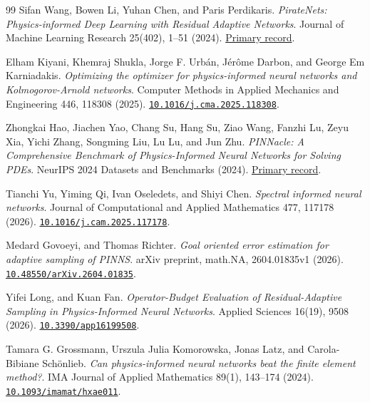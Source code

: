 \begin{thebibliography}{99}
Sifan Wang, Bowen Li, Yuhan Chen, and Paris Perdikaris.
\emph{PirateNets: Physics-informed Deep Learning with Residual Adaptive Networks}.
Journal of Machine Learning Research 25(402), 1--51 (2024).
\href{https://jmlr.org/papers/v25/24-0313.html}{Primary record}.

Elham Kiyani, Khemraj Shukla, Jorge F. Urb\'{a}n, J\'{e}r\^{o}me Darbon, and George Em Karniadakis.
\emph{Optimizing the optimizer for physics-informed neural networks and Kolmogorov-Arnold networks}.
Computer Methods in Applied Mechanics and Engineering 446, 118308 (2025).
\href{https://doi.org/10.1016/j.cma.2025.118308}{\nolinkurl{10.1016/j.cma.2025.118308}}.

Zhongkai Hao, Jiachen Yao, Chang Su, Hang Su, Ziao Wang, Fanzhi Lu, Zeyu Xia, Yichi Zhang, Songming Liu, Lu Lu, and Jun Zhu.
\emph{PINNacle: A Comprehensive Benchmark of Physics-Informed Neural Networks for Solving PDEs}.
NeurIPS 2024 Datasets and Benchmarks (2024).
\href{https://papers.nips.cc/paper/2024/file/8c63299fb2820ef41cb05e2ff11836f5-Paper-Datasets_and_Benchmarks_Track.pdf}{Primary record}.

Tianchi Yu, Yiming Qi, Ivan Oseledets, and Shiyi Chen.
\emph{Spectral informed neural networks}.
Journal of Computational and Applied Mathematics 477, 117178 (2026).
\href{https://doi.org/10.1016/j.cam.2025.117178}{\nolinkurl{10.1016/j.cam.2025.117178}}.

Medard Govoeyi, and Thomas Richter.
\emph{Goal oriented error estimation for adaptive sampling of PINNS}.
arXiv preprint, math.NA, 2604.01835v1 (2026).
\href{https://doi.org/10.48550/arXiv.2604.01835}{\nolinkurl{10.48550/arXiv.2604.01835}}.

Yifei Long, and Kuan Fan.
\emph{Operator-Budget Evaluation of Residual-Adaptive Sampling in Physics-Informed Neural Networks}.
Applied Sciences 16(19), 9508 (2026).
\href{https://doi.org/10.3390/app16199508}{\nolinkurl{10.3390/app16199508}}.

Tamara G. Grossmann, Urszula Julia Komorowska, Jonas Latz, and Carola-Bibiane Sch\"{o}nlieb.
\emph{Can physics-informed neural networks beat the finite element method?}.
IMA Journal of Applied Mathematics 89(1), 143--174 (2024).
\href{https://doi.org/10.1093/imamat/hxae011}{\nolinkurl{10.1093/imamat/hxae011}}.

\end{thebibliography}
